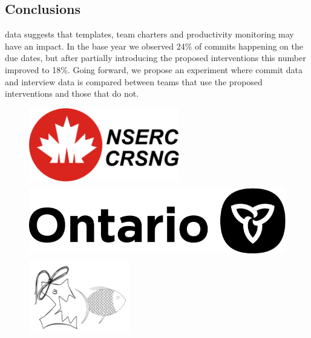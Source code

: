 \documentclass[poster, a1, plainboxedsections]{sciposter}
\begin{document}
\begin{multicols}{2}
\section{Conclusions}

 data suggests that templates, team charters and
productivity monitoring may have an impact.  In the base year we observed 24\%
of commits happening on the due dates, but after partially introducing the
proposed interventions this number improved to 18\%.  Going forward, we propose
an experiment where commit data and interview data is compared between teams
that use the proposed interventions and those that do not.

\begin{figure}[htbp]
  \centering
  \includegraphics[height=3.2cm,trim={0 0 28.5cm 0},clip]{nserc-logo.jpg}
  \hspace{0.5cm}
  \includegraphics[height=3.2cm,trim={16.5cm 0 0 0},clip]{ontario@2x-print.png}
  \hspace{0.5cm}
  \includegraphics[height=3.2cm,trim={0 0.5cm 0 0.48cm},clip]{outreachlogo.png}  
\end{figure}
  
\end{multicols}
\end{document}
